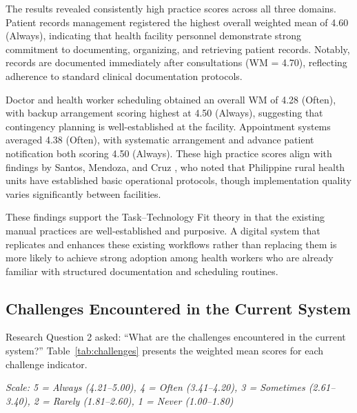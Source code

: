 \documentclass{research}
\begin{document}
The results revealed consistently high practice scores across all three domains. Patient records
management registered the highest overall weighted mean of 4.60 (Always), indicating that health
facility personnel demonstrate strong commitment to documenting, organizing, and retrieving patient
records. Notably, records are documented immediately after consultations (WM = 4.70), reflecting
adherence to standard clinical documentation protocols.

Doctor and health worker scheduling obtained an overall WM of 4.28 (Often), with backup
arrangement scoring highest at 4.50 (Always), suggesting that contingency planning is
well-established at the facility. Appointment systems averaged 4.38 (Often), with systematic
arrangement and advance patient notification both scoring 4.50 (Always). These high practice
scores align with findings by Santos, Mendoza, and Cruz \cite{Santos2021}, who noted that
Philippine rural health units have established basic operational protocols, though implementation
quality varies significantly between facilities.

These findings support the Task--Technology Fit theory \cite{TTF_Newcastle} in that the existing
manual practices are well-established and purposive. A digital system that replicates and enhances
these existing workflows rather than replacing them is more likely to achieve strong adoption
among health workers who are already familiar with structured documentation and scheduling
routines.

\subsection*{Challenges Encountered in the Current System}

Research Question 2 asked: ``What are the challenges encountered in the current system?''
Table~\ref{tab:challenges} presents the weighted mean scores for each challenge indicator.

\textit{Scale: 5 = Always (4.21--5.00), 4 = Often (3.41--4.20), 3 = Sometimes (2.61--3.40),
2 = Rarely (1.81--2.60), 1 = Never (1.00--1.80)}
\end{document}
